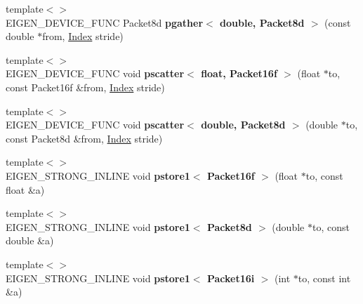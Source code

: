 \begin{DoxyCompactItemize}
\item 
\mbox{\label{namespace_eigen_1_1internal_ab531c26e04e9fa158424a51e8a44b2cc}} 
{\footnotesize template$<$$>$ }\\E\+I\+G\+E\+N\+\_\+\+D\+E\+V\+I\+C\+E\+\_\+\+F\+U\+NC Packet8d {\bfseries pgather$<$ double, Packet8d $>$} (const double $\ast$from, \hyperlink{namespace_eigen_a62e77e0933482dafde8fe197d9a2cfde}{Index} stride)
\item 
\mbox{\label{namespace_eigen_1_1internal_a44911dd861244d04be7e5888d20be418}} 
{\footnotesize template$<$$>$ }\\E\+I\+G\+E\+N\+\_\+\+D\+E\+V\+I\+C\+E\+\_\+\+F\+U\+NC void {\bfseries pscatter$<$ float, Packet16f $>$} (float $\ast$to, const Packet16f \&from, \hyperlink{namespace_eigen_a62e77e0933482dafde8fe197d9a2cfde}{Index} stride)
\item 
\mbox{\label{namespace_eigen_1_1internal_ab47eab2da549546b4e55a47981b0cdf5}} 
{\footnotesize template$<$$>$ }\\E\+I\+G\+E\+N\+\_\+\+D\+E\+V\+I\+C\+E\+\_\+\+F\+U\+NC void {\bfseries pscatter$<$ double, Packet8d $>$} (double $\ast$to, const Packet8d \&from, \hyperlink{namespace_eigen_a62e77e0933482dafde8fe197d9a2cfde}{Index} stride)
\item 
\mbox{\label{namespace_eigen_1_1internal_a694c0db7733ab3bf2a12973041b77d0d}} 
{\footnotesize template$<$$>$ }\\E\+I\+G\+E\+N\+\_\+\+S\+T\+R\+O\+N\+G\+\_\+\+I\+N\+L\+I\+NE void {\bfseries pstore1$<$ Packet16f $>$} (float $\ast$to, const float \&a)
\item 
\mbox{\label{namespace_eigen_1_1internal_aa0aefb49b9b78a738d312b7fa3af5aa7}} 
{\footnotesize template$<$$>$ }\\E\+I\+G\+E\+N\+\_\+\+S\+T\+R\+O\+N\+G\+\_\+\+I\+N\+L\+I\+NE void {\bfseries pstore1$<$ Packet8d $>$} (double $\ast$to, const double \&a)
\item 
\mbox{\label{namespace_eigen_1_1internal_afa0b330bad5d02668eb18a1f3a0ea106}} 
{\footnotesize template$<$$>$ }\\E\+I\+G\+E\+N\+\_\+\+S\+T\+R\+O\+N\+G\+\_\+\+I\+N\+L\+I\+NE void {\bfseries pstore1$<$ Packet16i $>$} (int $\ast$to, const int \&a)

\end{DoxyCompactItemize}
